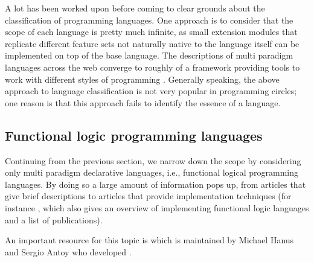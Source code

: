 \documentclass[thesis-solanki.tex]{subfiles}
\begin{document}
A lot has been worked upon before coming to clear grounds about the classification of programming languages.
One approach is to consider that the scope of each language is pretty much infinite, as small extension modules
that replicate different feature sets not naturally native to the language itself can be implemented on top of the
base language.
The descriptions of multi paradigm languages across the web
\cite{website:wikimultiparadigm,website:mdn,website:blogc2} converge to roughly of a framework providing tools to
work with different styles of programming \cite{website:wikimpllist,website:dmoz}.
Generally speaking, the above approach to language classification is not very popular in programming circles; one
reason is that this approach fails to identify the essence of a language.

\subsection{Functional logic programming languages}

Continuing from the previous section, we narrow down the scope by considering only multi paradigm declarative
languages, i.e., functional logical programming languages.
By doing so a large amount of information pops up, from articles that give brief descriptions
\cite{website:wikiflpl, website:wikiflpllist} to articles that provide implementation techniques (for instance
\cite{website:imlpementingflpl}, which also gives an overview of implementing functional logic languages and a list
of publications).

\begin{comment}
  The important piece however is the fact that there is a dedicated website \cite{website:funclogprog} for the
  history, research and development, existing languages, the literature, the contacts and everything else that one
  can think of for functional logic languages.
\end{comment}
An important resource for this topic is \cite{website:funclogprog} which is maintained by Michael Hanus
\cite{website:mhanus} and Sergio Antoy \cite{website:santoy} who developed  \cite{hanus1995curry}.

\begin{comment}
As a matter of fact the holy grail of information is maintained by two of the most important people in the field
Michael Hanus \cite{website:mhanus} and Sergio Antoy \cite{website:santoy}.
\end{comment}
\end{document}
